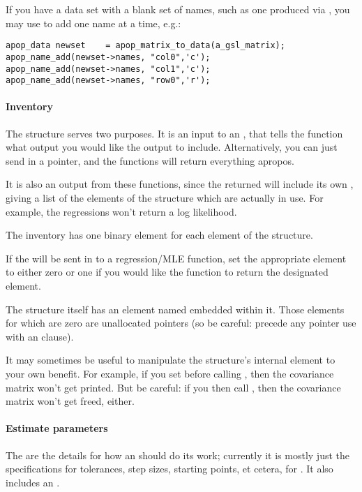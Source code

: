 If you have a data set with a blank set of names, such as one
produced via ,
you may use  to add one name at a
time, e.g.:
\begin{lstlisting}
apop_data newset    = apop_matrix_to_data(a_gsl_matrix);
apop_name_add(newset->names, "col0",'c');
apop_name_add(newset->names, "col1",'c');
apop_name_add(newset->names, "row0",'r');
\end{lstlisting}

\paragraph{Inventory}
The  structure serves two purposes. It is an input
to an , that tells the function what output you
would like the  output to include.  Alternatively, you
can just send in a  pointer, and the functions will return
everything apropos.

It is also an output from these functions, since the returned  will include its own ,
giving a list of the elements of the structure which are
actually in use. For example, the regressions won't return a log
likelihood.

The inventory has one binary element for each element of the  structure.

If the  will be sent in to a regression/MLE
function, set the appropriate element to either zero or one if you would
like the function to return the designated  element.

The  structure itself has an 
element named  embedded within it. Those elements for
which  are zero are unallocated pointers (so be careful:
precede any pointer use with an  clause).

It may sometimes be useful to manipulate the  structure's
internal  element to your own benefit. For
example, if you set  before calling
, then the covariance matrix won't get
printed. But be careful: if you then call ,
then the covariance matrix won't get freed, either.

\paragraph{Estimate parameters}
The  are the details for how an  should do its work; currently it is mostly just the specifications
for tolerances, step sizes, starting points, et cetera, for . It also includes an .  

